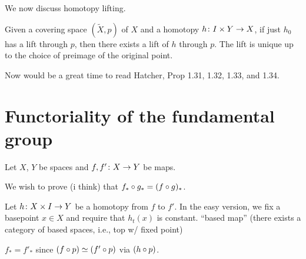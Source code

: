 \documentclass[11pt,leqno,oneside]{amsart}
\newenvironment{dateenv}{
  \vspace{1em}
}{
  \vspace{1em}
}
\newcommand{\mydate}[4]{
  \newdate{#1}{#2}{#3}{#4}
  \begin{dateenv}
    \hfill\displaydate{#1}
  \end{dateenv}
}
\numberwithin{thm}{section}
\newcommand{\homotopic}{\simeq}
\newcommand{\x}{\times}
\begin{document}
We now discuss homotopy lifting.

\begin{prop}
  Given a covering space \((\widetilde{X},p)\) of \(X\) and a homotopy
  \(h \from I \x Y \to X\), if just $h_0$ has a lift through $p$, then there exists a lift of \(h\) through $p$.  The lift is unique up to the choice of preimage of the original point.
  \begin{center}
  \end{center}
\end{prop}

\begin{rmk}
  Now would be a great time to read Hatcher, Prop 1.31, 1.32, 1.33, and 1.34.
\end{rmk}

\mydate{d4}{30}{1}{2017}

\section{Functoriality of the fundamental group}

Let $X$, $Y$ be spaces and $f,f' \colon X \to Y$ be maps.

We wish to prove (i think) that $f_* \circ g_* = (f \circ g)_*$.

Let $h\from X \x I \to Y$ be a homotopy from $f$ to $f'$.  In the easy version, we fix a basepoint $x \in X$ and require that $h_t(x)$ is constant. ``based map'' (there exists a category of based spaces, i.e., top w/ fixed point)

$f_* = f'_*$ since $(f \of p) \homotopic (f' \of p)$ via $(h \circ p)$.
\end{document}

